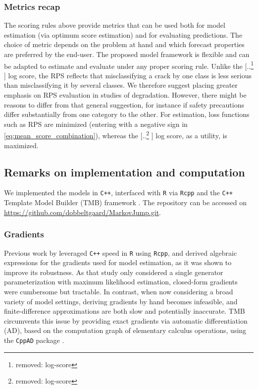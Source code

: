 \documentclass{article}
\providecommand{\DIFadd}[1]{{\protect\color{blue} \sf #1}} %
\providecommand{\DIFdel}[1]{{\protect\color{red} [..\footnote{removed: #1} ]}} %
\providecommand{\DIFaddbegin}{} %
\providecommand{\DIFaddend}{} %
\providecommand{\DIFdelbegin}{} %
\providecommand{\DIFdelend}{} %
\begin{document}
\subsubsection{Metrics recap} \label{sec:metrics_recap}
The scoring rules above provide metrics that can be used both for model estimation (via optimum score estimation) and for evaluating predictions. The choice of metric depends on the problem at hand and which forecast properties are preferred by the end-user. 
The proposed model framework is flexible and can be adapted to estimate and evaluate under any proper scoring rule.
Unlike the \DIFdelbegin \DIFdel{log-score}\DIFdelend \DIFaddbegin \DIFadd{log score}\DIFaddend , the RPS reflects that misclassifying a crack by one class is less serious than misclassifying it by several classes. We therefore suggest placing greater emphasis on RPS evaluation in studies of degradation. 
However, there might be reasons to differ from that general suggestion, for instance if safety precautions differ substantially from one category to the other.
For estimation, loss functions such as RPS are minimized (entering with a negative sign in \cref{eq:mean_score_combination}), whereas the \DIFdelbegin \DIFdel{log-score}\DIFdelend \DIFaddbegin \DIFadd{log score}\DIFaddend , as a utility, is maximized.


\subsection{Remarks on implementation and computation} \label{sec:computation_remarks}
We implemented the models in \texttt{C++}, interfaced with \texttt{R} via \texttt{Rcpp} \citep{Rcpp} and the \texttt{C++} Template Model Builder (TMB) framework \citep{TMB}.
The repository can be accessed on \url{https://github.com/dobbeltgaard/MarkovJump.git}.

\DIFaddbegin \subsubsection{\DIFadd{Gradients}} \DIFaddend Previous work by \citet{bisgaard2024A} leveraged \texttt{C++} speed in \texttt{R} using \texttt{Rcpp}, and derived algebraic expressions for the gradients used for model estimation, as it was shown to improve its robustness. 
As that study only considered a single generator parameterization with maximum likelihood estimation, closed-form gradients were cumbersome but tractable.
In contrast, when now considering a broad variety of model settings, deriving gradients by hand becomes infeasible, and finite-difference approximations are both slow and potentially inaccurate. TMB circumvents this issue by providing exact gradients via automatic differentiation (AD), based on the computation graph of elementary calculus operations, using the \texttt{CppAD} package \citep{CppAD}.
\end{document}
